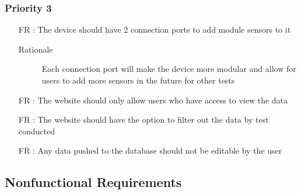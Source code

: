 \documentclass[12pt]{article}
\newcounter{reqnum} %
\begin{document}
\subsubsection{Priority 3}
\begin{itemize}
  \item[FR \refstepcounter{reqnum}\thereqnum:] The device should have 2 connection ports to add module sensors to it
  \begin{description} \item[Rationale] Each connection port will make the device more modular and allow for users to add more sensors in the future for other tests  \end{description}

  \item[FR \refstepcounter{reqnum}\thereqnum:] The website should only allow users who have access to view the data
  
  \item[FR \refstepcounter{reqnum}\thereqnum:] The website should have the option to filter out the data by test conducted
  
  \item[FR \refstepcounter{reqnum}\thereqnum:] Any data pushed to the database should not be editable by the user
  
  
  \end{itemize}

\newpage
\subsection{Nonfunctional Requirements}
\end{document}
